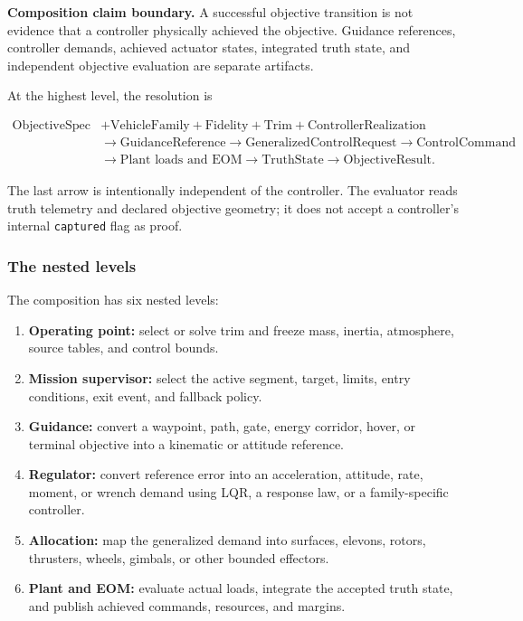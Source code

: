 \documentclass[11pt]{article}
\newcommand{\claimbox}[1]{%
  \par\noindent\colorbox{paleblue}{\parbox{0.94\linewidth}{#1}}\par
}
\begin{document}
\claimbox{\textbf{Composition claim boundary.} A successful objective
transition is not evidence that a controller physically achieved the
objective. Guidance references, controller demands, achieved actuator states,
integrated truth state, and independent objective evaluation are separate
artifacts.}

At the highest level, the resolution is

\[
\begin{split}
  \text{ObjectiveSpec} &+ \text{VehicleFamily} + \text{Fidelity}
    + \text{Trim} + \text{ControllerRealization} \\
  &\longrightarrow \text{GuidanceReference}
  \longrightarrow \text{GeneralizedControlRequest}
  \longrightarrow \text{ControlCommand} \\
  &\longrightarrow \text{Plant loads and EOM}
  \longrightarrow \text{TruthState}
  \longrightarrow \text{ObjectiveResult}.
\end{split}
\]

The last arrow is intentionally independent of the controller. The evaluator
reads truth telemetry and declared objective geometry; it does not accept a
controller's internal \texttt{captured} flag as proof.

\subsubsection{The nested levels}

The composition has six nested levels:

\begin{enumerate}
  \item \textbf{Operating point:} select or solve trim and freeze mass,
    inertia, atmosphere, source tables, and control bounds.
  \item \textbf{Mission supervisor:} select the active segment, target,
    limits, entry conditions, exit event, and fallback policy.
  \item \textbf{Guidance:} convert a waypoint, path, gate, energy corridor,
    hover, or terminal objective into a kinematic or attitude reference.
  \item \textbf{Regulator:} convert reference error into an acceleration,
    attitude, rate, moment, or wrench demand using LQR, a response law, or a
    family-specific controller.
  \item \textbf{Allocation:} map the generalized demand into surfaces,
    elevons, rotors, thrusters, wheels, gimbals, or other bounded effectors.
  \item \textbf{Plant and EOM:} evaluate actual loads, integrate the accepted
    truth state, and publish achieved commands, resources, and margins.
\end{enumerate}
\end{document}
